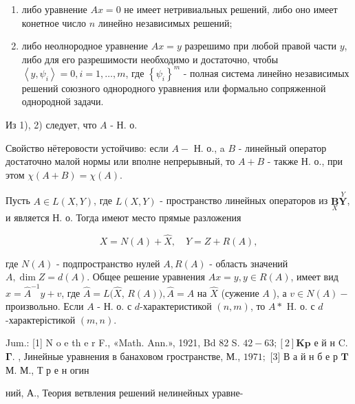 \documentclass[10pt]{article}
\begin{document}
\begin{enumerate}

  \item либо уравнение $A x=0$ не имеет нетривиальных решений, либо оно имеет конетное число $n$ линейно независимых решений;



  \item либо неолнородное уравнение $A x=y$ разрешимо при любой правой части $y$, либо для его разрешимости необходимо и достаточно, чтобы $\left\langle y, \psi_{i}\right\rangle=0, i=1, \ldots, m$, где $\left\{\psi_{i}\right\}^{m}$ - полная система линейно независимых решений союзного однородного уравнения или формально сопряженной однородной задачи.



\end{enumerate}



Из 1), 2) следует, что $A$ - Н. о.



Свойство нётеровости устойчиво: если $A-$ Н. о., a $B$ - линейный оператор достаточно малой нормы или вполне непрерывный, то $A+B$ - также Н. о., при этом $\chi(A+B)=\chi(A)$.



Пусть $A \in L(X, Y)$, где $L(X, Y)$ - пространство линейных операторов из $\underset{X}{\boldsymbol{B}} \stackrel{Y}{\boldsymbol{Y}}$, и является Н. о. Тогда имеют место прямые разложения



\[

X=N(A)+\hat{X}, \quad Y=Z+R(A),

\]



где $N(A)$ - подпространство нулей $A, R(A)$ - область значений $A, \operatorname{dim} Z=d(A)$. Общее решение уравнения $A x=y, y \in R(A)$, имеет вид $x=\hat{A}^{-1} y+v$, где $\hat{A}=L(\hat{X}$, $R(A)), \hat{A}=A$ на $\hat{X}$ (сужение $A$ ), а $v \in N(A)-$ произвольно. Если $A$ - Н. о. с $d$-характеристикой $(n, m)$, то $A *$ H. о. с $d$-характерістикой $(m, n)$.



Jum.: [1] N o e th e r F., «Math. Ann.», 1921, Bd 82 S. $42-63 ;[2] \mathbf{K} \mathbf{p}$ е й н C. $\boldsymbol{\Gamma}$. , Јинейные уравнения в банаховом гространстве, М., $1971 ;$ [3] В а й н б е р $\mathbf{T}$ М. М., Т р е н огин

ний, А., Теория ветвления решений нелинейных уравне-
\end{document}
